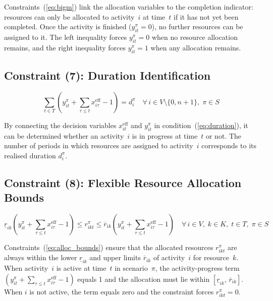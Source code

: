 Constraints~(\ref{eq:bigm}) link the allocation variables to the
completion indicator: resources can only be allocated to
activity~$i$ at time~$t$ if it has not yet been completed. Once the activity is finished
($y_{it}^{\pi} = 0$), no further resources can be assigned to it.
The left inequality forces $y_{it}^{\pi} = 0$ when no resource
allocation remains, and the right inequality forces
$y_{it}^{\pi} = 1$ when any allocation remains.

\subsection*{Constraint (7): Duration Identification}

\begin{equation}
    \sum_{t \in T}
    \left(
        y_{it}^{\pi}
        + \sum_{\tau \leq t} x^{\mathrm{eff}}_{i\tau} - 1
    \right)
    = d_i^{\pi}
    \quad \forall\, i \in V \setminus \{0, n{+}1\},\;
    \pi \in S
    \tag{7}
    \label{eq:duration}
\end{equation}

By connecting the decision variables $x^{\mathrm{eff}}_{it}$ and
$y_{it}^{\pi}$ in condition~(\ref{eq:duration}), it can be
determined whether an activity~$i$ is in progress at time~$t$ or
not. The number of periods in which resources are assigned to
activity~$i$ corresponds to its realised duration $d_i^{\pi}$.

\subsection*{Constraint (8): Flexible Resource Allocation Bounds}

\begin{equation}
    \underline{r}_{ik}
    \left(
        y_{it}^{\pi}
        + \sum_{\tau \leq t} x^{\mathrm{eff}}_{i\tau} - 1
    \right)
    \leq r_{ikt}^{\pi}
    \leq \overline{r}_{ik}
    \left(
        y_{it}^{\pi}
        + \sum_{\tau \leq t} x^{\mathrm{eff}}_{i\tau} - 1
    \right)
    \quad \forall\, i \in V,\;
    k \in K,\;
    t \in T,\;
    \pi \in S
    \tag{8}
    \label{eq:alloc_bounds}
\end{equation}

Constraints~(\ref{eq:alloc_bounds}) ensure that the allocated
resources $r_{ikt}^{\pi}$ are always within the lower
$\underline{r}_{ik}$ and upper limits $\overline{r}_{ik}$ of
activity~$i$ for resource~$k$. When activity~$i$ is active at
time~$t$ in scenario~$\pi$, the activity-progress term
$(y_{it}^{\pi} + \sum_{\tau \leq t} x^{\mathrm{eff}}_{i\tau} - 1)$
equals 1 and the allocation must lie within
$[\underline{r}_{ik},\, \overline{r}_{ik}]$. When $i$ is not
active, the term equals zero and the constraint forces
$r_{ikt}^{\pi} = 0$.

